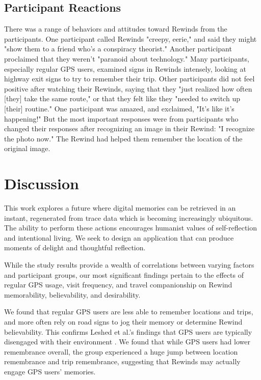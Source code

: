 \documentclass{sigchi}
\begin{document}
\subsection{Participant Reactions}
There was a range of behaviors and attitudes toward Rewinds from the participants. One participant called Rewinds "creepy, eerie," and said they might "show them to a friend who's a conspiracy theorist." Another participant proclaimed that they weren't "paranoid about technology." Many participants, especially regular GPS users, examined signs in Rewinds intensely, looking at highway exit signs to try to remember their trip. Other participants did not feel positive after watching their Rewinds, saying that they "just realized how often [they] take the same route," or that they felt like they "needed to switch up [their] routine." One participant was amazed, and exclaimed, "It's like it's happening!" But the most important responses were from participants who changed their responses after recognizing an image in their Rewind: "I recognize the photo now." The Rewind had helped them remember the location of the original image.

\section{Discussion}
This work explores a future where digital memories can be retrieved in an instant, regenerated from trace data which is becoming increasingly ubiquitous. The ability to perform these actions encourages humanist values of self-reflection and intentional living. We seek to design an application that can produce moments of delight and thoughtful reflection.

While the study results provide a wealth of correlations between varying factors and participant groups, our most significant findings pertain to the effects of regular GPS usage, visit frequency, and travel companionship on Rewind memorability, believability, and desirability. 

We found that regular GPS users are less able to remember locations and trips, and more often rely on road signs to jog their memory or determine Rewind believability. This confirms Leshed et al.'s findings that GPS users are typically disengaged with their environment \cite{leshed2008car}. We found that while GPS users had lower remembrance overall, the group experienced a huge jump between location remembrance and trip remembrance, suggesting that Rewinds may actually engage GPS users' memories. 
\end{document}
